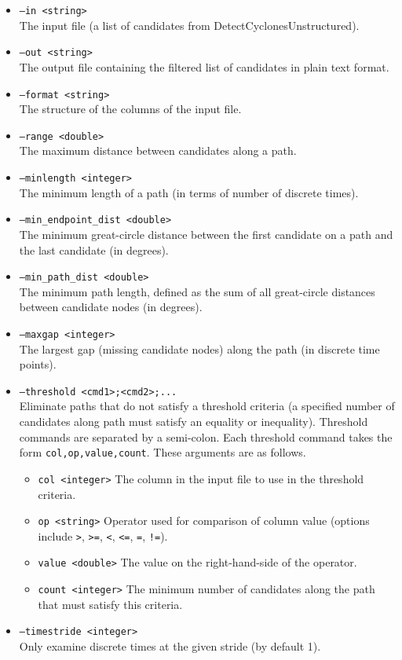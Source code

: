\documentclass[gmdd, hvmath, online]{copernicus_discussions}
\begin{document}
\begin{itemize}
\item[] \texttt{--in <string>} \\ The input file (a list of candidates from DetectCyclonesUnstructured).
\item[] \texttt{--out <string>} \\ The output file containing the filtered list of candidates in plain text format.
\item[] \texttt{--format <string>} \\ The structure of the columns of the input file.
\item[] \texttt{--range <double>} \\ The maximum distance between candidates along a path.
\item[] \texttt{--minlength <integer>} \\ The minimum length of a path (in terms of number of discrete times).
\item[] \texttt{--min\_endpoint\_dist <double>} \\ The minimum great-circle distance between the first candidate on a path and the last candidate (in degrees).
\item[] \texttt{--min\_path\_dist <double>} \\ The minimum path length, defined as the sum of all great-circle distances between candidate nodes (in degrees).
\item[] \texttt{--maxgap <integer>} \\ The largest gap (missing candidate nodes) along the path (in discrete time points).
\item[] \texttt{--threshold <cmd1>;<cmd2>;...} \\  Eliminate paths that do not satisfy a threshold criteria (a specified number of candidates along path must satisfy an equality or inequality).  Threshold commands are separated by a semi-colon.  Each threshold command takes the form \texttt{col,op,value,count}.  These arguments are as follows.
\begin{itemize}
\item[] \texttt{col <integer>}  The column in the input file to use in the threshold criteria.
\item[] \texttt{op <string>}  Operator used for comparison of column value (options include \texttt{>}, \texttt{>=}, \texttt{<}, \texttt{<=}, \texttt{=}, \texttt{!=}).
\item[] \texttt{value <double>}  The value on the right-hand-side of the operator. 
\item[] \texttt{count <integer>}  The minimum number of candidates along the path that must satisfy this criteria.
\end{itemize}
\item[] \texttt{--timestride <integer>} \\ Only examine discrete times at the given stride (by default 1).
\end{itemize}
\end{document}
